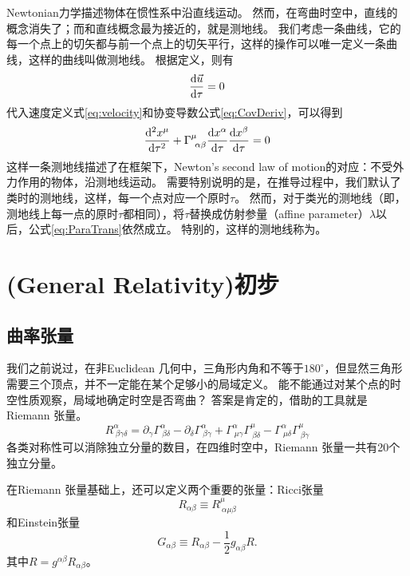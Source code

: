Newtonian力学描述物体在惯性系中沿直线运动。
然而，在弯曲时空中，直线的概念消失了；而和直线概念最为接近的，就是测地线。
我们考虑一条曲线，它的每一个点上的切矢都与前一个点上的切矢平行，这样的操作可以唯一定义一条曲线，这样的曲线叫做测地线。
根据定义，则有
\begin{equation}\label{eq:ParaTrans}
  \frac{{\rm d}\vec{u}}{{\rm d}\tau}=0
\end{equation}
代入速度定义式\ref{eq:velocity}和协变导数公式\ref{eq:CovDeriv}，可以得到
\begin{equation}\label{eq:ParaTrans}
  \frac{{\rm d}^2 x^\mu}{{\rm d}\tau^2}+ \Gamma^\mu_{~\alpha\beta}\frac{{\rm d}x^\alpha}{{\rm d}\tau}\frac{{\rm d}x^\beta}{{\rm d}\tau}=0
\end{equation}
这样一条测地线描述了在\GR 框架下，Newton's second law of motion的对应：不受外力作用的物体，沿测地线运动。
需要特别说明的是，在推导过程中，我们默认了类时的测地线，这样，每一个点对应一个原时$\tau$。
然而，对于类光的测地线（即，测地线上每一点的原时$\tau$都相同），将$\tau$替换成仿射参量（affine parameter）$\lambda$以后，公式\ref{eq:ParaTrans}依然成立。
特别的，这样的测地线称为{}。

\section{\GR (General Relativity)初步}
\subsection{曲率张量}
我们之前说过，在非Euclidean 几何中，三角形内角和不等于$180^\circ$，但显然三角形需要三个顶点，并不一定能在某个足够小的局域定义。
能不能通过对某个点的时空性质观察，局域地确定时空是否弯曲？
答案是肯定的，借助的工具就是Riemann 张量。
\begin{equation}\label{eq:RiemannTensor}
  R^\alpha_{~\beta\gamma\delta}= \partial_\gamma \Gamma^{\alpha}_{~\beta \delta}- \partial_\delta\Gamma^{\alpha}_{~\beta \gamma }+\Gamma^{\alpha}_{~\mu \gamma }\Gamma^{\mu}_{~\beta \delta }-\Gamma^{\alpha}_{~\mu \delta }\Gamma^{\mu}_{~\beta \gamma } \end{equation}
各类对称性可以消除独立分量的数目，在四维时空中，Riemann 张量一共有20个独立分量。

在Riemann 张量基础上，还可以定义两个重要的张量：Ricci张量
\begin{equation}\label{eq:RicciTensor}
  R_{\alpha\beta} \equiv R^\mu_{~\alpha\mu\beta}
\end{equation}
和Einstein张量
\begin{equation}\label{eq:RicciTensor}
  G_{\alpha\beta} \equiv R_{\alpha\beta} -\frac{1}{2}g_{\alpha\beta}R.
\end{equation}
其中$R =g^{\alpha\beta}R_{\alpha\beta}$。


